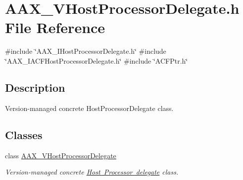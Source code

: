 \hypertarget{a00713}{}\section{A\+A\+X\+\_\+\+V\+Host\+Processor\+Delegate.\+h File Reference}
\label{a00713}
{\ttfamily \#include \char`\"{}A\+A\+X\+\_\+\+I\+Host\+Processor\+Delegate.\+h\char`\"{}}\newline
{\ttfamily \#include \char`\"{}A\+A\+X\+\_\+\+I\+A\+C\+F\+Host\+Processor\+Delegate.\+h\char`\"{}}\newline
{\ttfamily \#include \char`\"{}A\+C\+F\+Ptr.\+h\char`\"{}}\newline


\subsection{Description}
Version-\/managed concrete Host\+Processor\+Delegate class. 

\subsection*{Classes}
\begin{DoxyCompactItemize}
\item 
class \mbox{\hyperlink{a01921}{A\+A\+X\+\_\+\+V\+Host\+Processor\+Delegate}}
\begin{DoxyCompactList}\small\item\em Version-\/managed concrete \mbox{\hyperlink{a01837}{Host Processor delegate}} class. \end{DoxyCompactList}\end{DoxyCompactItemize}
